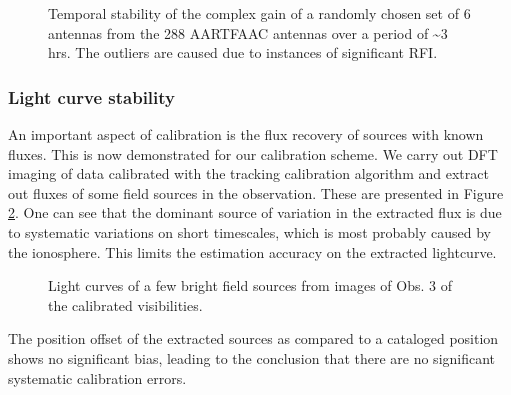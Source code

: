 \documentclass{aa}
\begin{document}
\begin{figure}[tbh]
\caption{\label{fig:gain-Temporal-stability}Temporal  stability  of the  complex
  gain of  a randomly chosen  set of 6  antennas from the 288  AARTFAAC antennas
  over  a  period  of \textasciitilde3  hrs.  The  outliers  are caused  due  to
  instances of significant RFI.}
\end{figure}

\subsubsection{Light curve stability}

An important  aspect of calibration is  the flux recovery of  sources with known
fluxes. This is  now demonstrated for our calibration scheme.   We carry out DFT
imaging of data  calibrated with the tracking calibration  algorithm and extract
out fluxes  of some field  sources in the  observation.  These are  presented in
Figure  \ref{fig:Light-curves-of}.  One  can  see that  the  dominant source  of
variation  in  the extracted  flux  is due  to  systematic  variations on  short
timescales, which  is most probably caused  by the ionosphere.   This limits the
estimation accuracy on the extracted lightcurve.

\begin{figure}[tbh]

\caption{\label{fig:Light-curves-of}Light curves of a few bright
field sources from images of Obs. 3 of the calibrated visibilities.}
\end{figure}
The position offset  of the extracted sources as  compared to a cataloged position
shows  no  significant  bias,  leading  to  the conclusion  that  there  are  no
significant systematic calibration errors.
\end{document}
